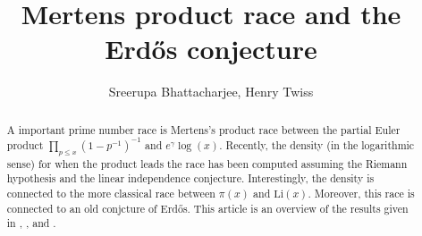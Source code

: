 \documentclass[12pt,reqno]{amsart}
\theoremstyle{definition}
\numberwithin{equation}{section}
\begin{document}
\begin{abstract}
    A important prime number race is Mertens's product race between the partial Euler product $\prod_{p \le x}(1-p^{-1})^{-1}$ and $e^{\gamma}\log(x)$. Recently, the density (in the logarithmic sense) for when the product leads the race has been computed assuming the Riemann hypothesis and the linear independence conjecture. Interestingly, the density is connected to the more classical race between $\pi(x)$ and $\mathrm{Li}(x)$. Moreover, this race is connected to an old conjcture of Erd\H{o}s. This article is an overview of the results given in \cite{Li}, \cite{La}, and \cite{LMP}.
\end{abstract}

\title{Merten\textquotesingle s product race and the Erd\H{o}s conjecture}
\author{Sreerupa Bhattacharjee, Henry Twiss}
\maketitle
\thispagestyle{empty}
\end{document}
